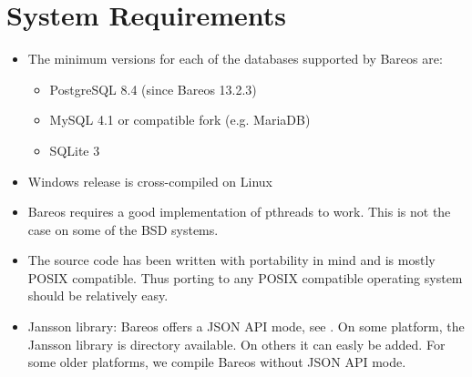 
\chapter{System Requirements}
\label{SysReqs}

\begin{itemize}
\item The minimum versions for each of the databases supported by Bareos
   are:
   \begin{itemize}
   \item PostgreSQL 8.4 (since Bareos 13.2.3)
   \item MySQL 4.1 or compatible fork (e.g. MariaDB)
   \item SQLite 3
   \end{itemize}
\item Windows release is cross-compiled on Linux
\item Bareos requires a good implementation of pthreads to work.  This
   is not the case on some of the BSD systems.
\item The source code has been written with portability in mind and is  mostly
   POSIX compatible. Thus porting to any POSIX compatible  operating system
   should be relatively easy.
\item Jansson library:
    \label{jansson}
    Bareos  offers a JSON API mode, see \bareosDeveloperGuideApiModeJson. On some platform, the Jansson library is directory available. On others it can easly be added. For some older platforms, we compile Bareos without JSON API mode.
\end{itemize}
